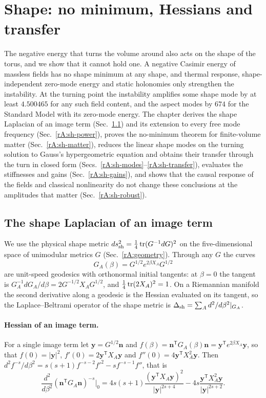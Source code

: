 \section{Shape: no minimum, Hessians and transfer}\label{rep:shape}

The negative energy that turns the volume around also acts on the shape of the torus, and we show that it cannot hold one.
A negative Casimir energy of massless fields has no shape minimum at any shape, and thermal response, shape-independent zero-mode energy and static holonomies only strengthen the instability.
At the turning point the instability amplifies some shape mode by at least $4.500465$ for any such field content, and the aspect modes by $674$ for the Standard Model with its zero-mode energy. %
The chapter derives the shape Laplacian of an image term (Sec.~\ref{rA:sh-laplacian}) and its extension to every free mode frequency (Sec.~\ref{rA:sh-power}), proves the no-minimum theorem for finite-volume matter (Sec.~\ref{rA:sh-matter}), reduces the linear shape modes on the turning solution to Gauss's hypergeometric equation and obtains their transfer through the turn in closed form (Secs.~\ref{rA:sh-modes}--\ref{rA:sh-transfer}), evaluates the stiffnesses and gains (Sec.~\ref{rA:sh-gains}), and shows that the causal response of the fields and classical nonlinearity do not change these conclusions at the amplitudes that matter (Sec.~\ref{rA:sh-robust}).

\subsection{The shape Laplacian of an image term}
\label{rA:sh-laplacian}

We use the physical shape metric $ds^2_{\mathrm{sh}}=\tfrac14\operatorname{tr}(G^{-1}dG)^2$ on the five-dimensional space of unimodular metrics $G$ (Sec.~\ref{rA:geometry}).
Through any $G$ the curves
\begin{equation}
G_A(\beta)=G^{1/2}e^{2\beta X_A}G^{1/2}
\end{equation}
are unit-speed geodesics with orthonormal initial tangents: at $\beta=0$ the tangent is $G_A^{-1}dG_A/d\beta=2G^{-1/2}X_AG^{1/2}$, and $\tfrac14\operatorname{tr}(2X_A)^2=1$.
On a Riemannian manifold the second derivative along a geodesic is the Hessian evaluated on its tangent, so the Laplace--Beltrami operator of the shape metric is $\Delta_{\mathrm{sh}}=\sum_Ad^2/d\beta^2|_{G_A}$.

\paragraph{Hessian of an image term.}
For a single image term let $\bm y=G^{1/2}\bm n$ and $f(\beta)=\bm n^{\mathsf T}G_A(\beta)\bm n=\bm y^{\mathsf T}e^{2\beta X_A}\bm y$, so that $f(0)=|\bm y|^2$, $f'(0)=2\bm y^{\mathsf T}X_A\bm y$ and $f''(0)=4\bm y^{\mathsf T}X_A^2\bm y$.
Then $d^2f^{-s}/d\beta^2=s(s+1)f^{-s-2}f'^2-sf^{-s-1}f''$, that is
\begin{equation}
\frac{d^2}{d\beta^2}(\bm n^{\mathsf T}G_A\bm n)^{-s}\Big|_0
=4s(s+1)\frac{(\bm y^{\mathsf T}X_A\bm y)^2}{|\bm y|^{2s+4}}-4s\frac{\bm y^{\mathsf T}X_A^2\bm y}{|\bm y|^{2s+2}} .
\label{eq:rA-image-hessian}
\end{equation}

